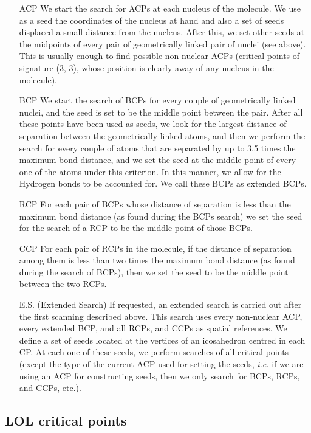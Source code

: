 \begin{itemize}
\item[ACP] We start the search for ACPs at each nucleus of the molecule. We use as a seed the 
  coordinates of the nucleus at hand and also a set of seeds displaced a small distance from
  the nucleus. After this, we set other seeds at the midpoints of every pair of 
  geometrically linked pair of nuclei (see above). This is usually enough to find possible
  non-nuclear ACPs (critical points of signature (3,-3), whose position is clearly away
  of any nucleus in the molecule).
\item[BCP] We start the search of BCPs for every couple of geometrically linked nuclei, and the seed
  is set to be the middle point between the pair. After all these points have been used as seeds,
  we look for the largest distance of separation between the geometrically linked atoms,
  and then we perform the search for every couple of atoms that are separated by up to 3.5
  times the maximum bond distance, and we set the seed at the middle point of every one of
  the atoms under this criterion. In this manner, we allow for the Hydrogen bonds
  to be accounted for. We call these BCPs as extended BCPs.
\item[RCP] For each pair of BCPs whose distance of separation is less than the maximum bond distance
  (as found during the BCPs search) we set the seed for the search of a RCP to be the middle point of those BCPs.
\item[CCP] For each pair of RCPs in the molecule, if the distance of separation among them is less than two times the maximum bond distance (as found during the search of BCPs), then we set the seed to be the middle point between the two RCPs.
\item [E.S.] (Extended Search) If requested, an extended search is carried out after the first scanning described 
  above. This search uses every non-nuclear ACP, every extended BCP, and all RCPs, and CCPs as 
  spatial references. We define a set of seeds located at the vertices of an
  icosahedron centred in each CP. At each one of these seeds, we perform searches of all critical points (except the
  type of the current ACP used for setting the seeds, \textit{i.e.} if we are using an ACP for 
  constructing seeds, then we only search for BCPs, RCPs, and CCPs, etc.).
\end{itemize}

\subsection{LOL critical points}

